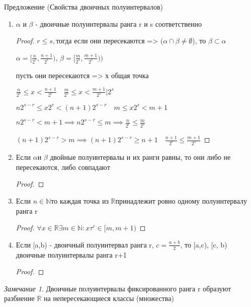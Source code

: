 \documentclass[a4paper, 12pt]{article}
\theoremstyle{definition}
\theoremstyle{remark}
\newtheorem*{remark}{Замечание}
\begin{document}
Предложение (Свойства двоичных полуинтервалов)
\begin{enumerate}
     \item $\alpha$ и $\beta$ - двоичные полуинтервалы ранга r и s соответственно
     \begin{proof}
          $r\leq s, $тогда если они пересекаются => ($\alpha \cap \beta\neq\emptyset$), то $\beta \subset \alpha$

     $\alpha = [\frac{n}{2^r}, \frac{n+1}{2^r})$, $\beta = [\frac{m}{2^s}, \frac{m+1}{2^s}))$

     пусть они пересекаются => х общая точка

     $\frac{n}{2^r}\leq x < \frac{n+1}{2^r}\quad \frac{m}{2^s}\leq x < \frac{m+1}{2^s} | 2^s$

     $n2^{s-r}\leq x 2^r < (n+1)2^{s-r}\quad m \leq x 2^s < m+1$

     $n 2^{s-r}< m+1 \implies n 2^{s-r}\leq m\implies \frac{n}{2^r}\leq \frac{m}{2^s}$

     $(n+1)2^{s-r}> m\implies (n+1)2^{s-r}\geq n+1\quad \frac{n+1}{2^r}\leq \frac{m+1}{2^s}$

     \end{proof}
     \item Если $\alpha$и $\beta$ двойные полуинтервалы и их ранги равны, то они либо не пересекаются, либо совпадают
     \begin{proof}
          
     \end{proof} 
     \item Если $n\in \mathbb{N} $то каждая точка из $\mathbb{R} $принадлежит ровно одному полуинтервалу ранга r
     
     \begin{proof}
          $\forall x\in\mathbb{R} \exists m \in \mathbb{N} : x\tau^r\in[m, m+1)$
     \end{proof}
     \item Если [a,b) - двоичный полуинтервал ранга r, $c = \frac{a+b}{2}$, то [a,c), [c, b) двоичные полуинтервалы ранга r+1
     \begin{proof}
          
     \end{proof}
\end{enumerate}
\begin{remark}
     Двоичные полуинтервалы фиксированного ранга r образуют разбиение $\mathbb{R} $ на непересекающиеся классы (множества)

\end{remark}
\end{document}
